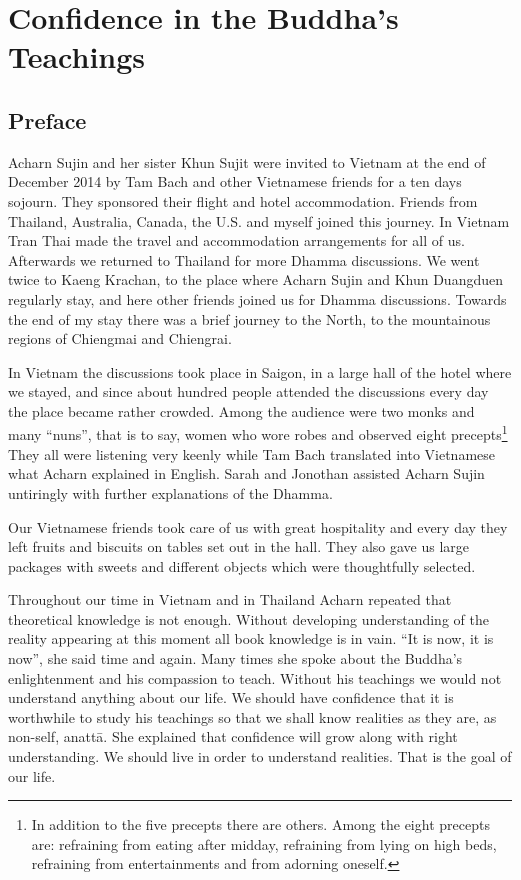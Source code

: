 \part{Confidence in the Buddha's Teachings}



\chapter{Preface}

Acharn Sujin and her sister Khun Sujit
were invited to Vietnam at the end of December 2014 by Tam Bach and
other Vietnamese friends for a ten days sojourn. They sponsored their
flight and hotel accommodation. Friends from Thailand, Australia,
Canada, the U.S. and myself joined this journey. In Vietnam Tran Thai
made the travel and accommodation arrangements for all of us. Afterwards
we returned to Thailand for more Dhamma discussions. We went twice to
Kaeng Krachan, to the place where Acharn Sujin and Khun Duangduen
regularly stay, and here other friends joined us for Dhamma discussions.
Towards the end of my stay there was a brief journey to the North, to
the mountainous regions of Chiengmai and Chiengrai. 

In Vietnam the discussions took place
in Saigon, in a large hall of the hotel where we stayed, and since about
hundred people attended the discussions every day the place became
rather crowded. Among the audience were two monks and many ``nuns'',
that is to say, women who wore robes and observed eight
precepts\footnote{In addition to the five precepts
there are others. Among the eight precepts are: refraining from eating
after midday, refraining from lying on high beds, refraining from
entertainments and from adorning oneself.}
They all were listening very keenly while Tam Bach translated into
Vietnamese what Acharn explained in English. Sarah and Jonothan assisted
Acharn Sujin untiringly with further explanations of the Dhamma. 

Our Vietnamese friends took care of us with great hospitality and every day they left fruits and biscuits on tables set out in the hall. They also gave us large packages with sweets
and different objects which were thoughtfully selected. 

Throughout our time in Vietnam and in Thailand Acharn repeated that theoretical knowledge is not enough.
Without developing understanding of the reality appearing at this moment
all book knowledge is in vain. ``It is now, it is now'', she said time
and again. Many times she spoke about the Buddha's enlightenment and his
compassion to teach. Without his teachings we would not understand
anything about our life. We should have confidence that it is worthwhile
to study his teachings so that we shall know realities as they are, as
non-self, anattā. She explained that confidence will grow along with
right understanding. We should live in order to understand realities.
That is the goal of our life.




